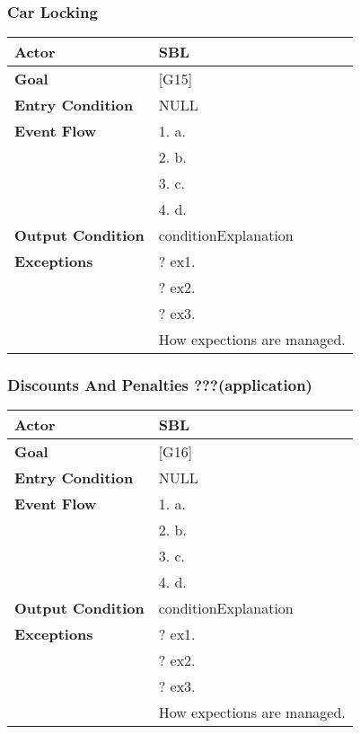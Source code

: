 \subsubsection{Car Locking}
\begin{tabular}{| l | p{8cm} |}
\hline
\textbf{Actor}      &       SBL \\
\hline
\textbf{Goal}       &       [G15]\\
\hline
\textbf{Entry Condition} &  NULL\\
\hline
\textbf{Event Flow}     &   1.	a.\\&
                                            2.	b.\\&
                                            3.	c.\\&
                                            4.  d.\\
\hline
\textbf{Output Condition} & conditionExplanation\\
\hline
\textbf{Exceptions} &       ?   ex1.\\& 
                            ?	ex2.\\&
                            ?	ex3.\\& 
                           How expections are managed.\\
\hline
\end{tabular} 


\subsubsection{Discounts And Penalties ???(application)}
\begin{tabular}{| l | p{8cm} |}
\hline
\textbf{Actor}      &       SBL \\
\hline
\textbf{Goal}       &       [G16]\\
\hline
\textbf{Entry Condition} &  NULL\\
\hline
\textbf{Event Flow}     &   1.	a.\\&
                                            2.	b.\\&
                                            3.	c.\\&
                                            4.  d.\\
\hline
\textbf{Output Condition} & conditionExplanation\\
\hline
\textbf{Exceptions} &       ?   ex1.\\& 
                            ?	ex2.\\&
                            ?	ex3.\\& 
                           How expections are managed.\\
\hline
\end{tabular} 


